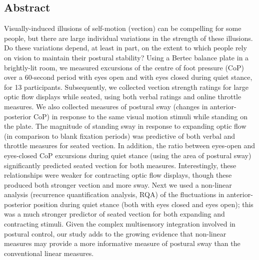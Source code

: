 \documentclass[11pt]{article}
\begin{document}
\begin{linenumbers}
\def\linenumberfont{\normalfont\small\sffamily}

\section*{Abstract}
Visually-induced illusions of self-motion (vection) can be compelling for some people, but there are large individual variations in the strength of these illusions. Do these variations depend, at least in part, on the extent to which people rely on vision to maintain their postural stability? Using a Bertec balance plate in a brightly-lit room, we measured excursions of the centre of foot pressure (CoP) over a 60-second period with eyes open and with eyes closed during quiet stance, for 13 participants. Subsequently, we collected vection strength ratings for large optic flow displays while seated, using both verbal ratings and online throttle measures. We also collected measures of postural sway (changes in anterior-posterior CoP) in response to the same visual motion stimuli while standing on the plate. The magnitude of standing sway in response to expanding optic flow (in comparison to blank fixation periods) was predictive of both verbal and throttle measures for seated vection. In addition, the ratio between eyes-open and eyes-closed CoP excursions during quiet stance (using the area of postural sway) significantly predicted seated vection for both measures. Interestingly, these relationships were weaker for contracting optic flow displays, though these produced both stronger vection and more sway. Next we used a non-linear analysis (recurrence quantification analysis, RQA) of the fluctuations in anterior-posterior position during quiet stance (both with eyes closed and eyes open); this was a much stronger predictor of seated vection for both expanding and contracting stimuli. Given the complex multisensory integration involved in postural control, our study adds to the growing evidence that non-linear measures may provide a more informative measure of postural sway than the conventional linear measures. 


\end{linenumbers}
\end{document}
